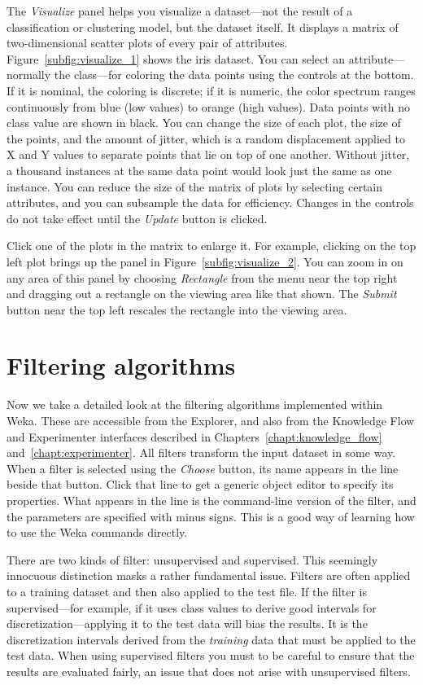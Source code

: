 The \textit{Visualize} panel helps you visualize a dataset---not the
result of a classification or clustering model, but the dataset
itself. It displays a matrix of two-dimensional scatter plots of every
pair of attributes. Figure~\ref{subfig:visualize_1} shows the iris dataset. You can
select an attribute---normally the class---for coloring the data
points using the controls at the bottom. If it is nominal, the
coloring is discrete; if it is numeric, the color spectrum ranges
continuously from blue (low values) to orange (high values). Data
points with no class value are shown in black. You can change the size
of each plot, the size of the points, and the amount of jitter, which
is a random displacement applied to X and Y values to separate points
that lie on top of one another. Without jitter, a thousand instances
at the same data point would look just the same as one instance. You
can reduce the size of the matrix of plots by selecting certain
attributes, and you can subsample the data for efficiency. Changes in
the controls do not take effect until the \textit{Update} button is
clicked.

Click one of the plots in the matrix to enlarge it. For example,
clicking on the top left plot brings up the panel in
Figure~\ref{subfig:visualize_2}. You can zoom in on any area of this
panel by choosing \textit{Rectangle} from the menu near the top right
and dragging out a rectangle on the viewing area like that shown. The
\textit{Submit} button near the top left rescales the rectangle into
the viewing area.

\section{Filtering algorithms}

Now we take a detailed look at the filtering algorithms implemented
within Weka. These are accessible from the Explorer, and also from the
Knowledge Flow and Experimenter interfaces described in
Chapters~\ref{chapt:knowledge_flow} and~\ref{chapt:experimenter}. All
filters transform the input dataset in some way. When a filter is
selected using the \textit{Choose} button, its name appears in the line beside
that button. Click that line to get a generic object editor to specify
its properties. What appears in the line is the command-line version
of the filter, and the parameters are specified with minus signs. This
is a good way of learning how to use the Weka commands directly.

There are two kinds of filter: unsupervised and supervised. This
seemingly innocuous distinction masks a rather fundamental
issue. Filters are often applied to a training dataset and then also
applied to the test file. If the filter is supervised---for example,
if it uses class values to derive good intervals for
discretization---applying it to the test data will bias the
results. It is the discretization intervals derived from the
\textit{training} data that must be applied to the test data. When
using supervised filters you must to be careful to ensure that the
results are evaluated fairly, an issue that does not arise with
unsupervised filters.

